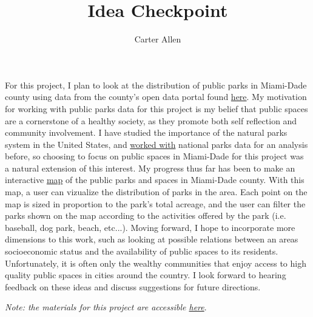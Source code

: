 \documentclass[12pt]{article}
\title{Idea Checkpoint}
\author{Carter Allen}
\begin{document}
\maketitle
\raggedright

For this project, I plan to look at the distribution of public parks in Miami-Dade county using data from the county's open data portal found \href{https://opendata.miamidade.gov/Infrastructure/Parks-Facities/wjhr-nx6u}{here}. My motivation for working with public parks data for this project is my belief that public spaces are a cornerstone of a healthy society, as they promote both self reflection and community involvement. I have studied the importance of the natural parks system in the United States, and \href{https://sufficientlyminimal.netlify.com/2018/01/28/congaree-big-trees/}{worked with} national parks data for an analysis before, so choosing to focus on public spaces in Miami-Dade for this project was a natural extension of this interest. My progress thus far has been to make an interactive \href{https://carter-allen.shinyapps.io/Miami_Parks/}{map} of the public parks and spaces in Miami-Dade county. With this map, a user can vizualize the distribution of parks in the area. Each point on the map is sized in proportion to the park's total acreage, and the user can filter the parks shown on the map according to the activities offered by the park (i.e. baseball, dog park, beach, etc...). Moving forward, I hope to incorporate more dimensions to this work, such as looking at possible relations between an areas socioeconomic status and the availability of public spaces to its residents. Unfortunately, it is often only the wealthy communities that enjoy access to high quality public spaces in cities around the country. I look forward to hearing feedback on these ideas and discuss suggestions for future directions.

\textit{Note: the materials for this project are accessible \href{https://carter-allen.github.io/VizUM/}{here}}.
\end{document}
